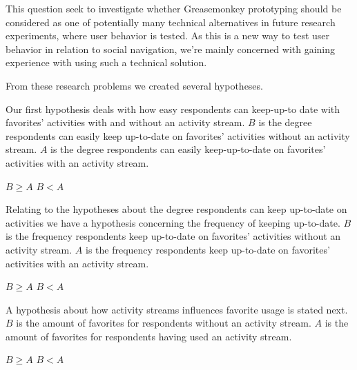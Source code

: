 This question seek to investigate whether Greasemonkey prototyping should be
considered as one of potentially many technical alternatives in future
research experiments, where user behavior is tested. As this is a new way
to test user behavior in relation to social navigation, we're mainly concerned
with gaining experience with using such a technical solution.

\parabreak

From these research problems we created several hypotheses.

Our first hypothesis deals with how easy respondents can keep-up-to
date with favorites' activities with and without an 
activity stream.
$B$ is the degree respondents can easily keep up-to-date on
favorites' activities without an activity stream. $A$ is the degree
respondents can easily keep-up-to-date on favorites' activities  with
an activity stream.
\begin{items}
   $B \geq A$
   $B < A$
\end{items}

Relating to the hypotheses about the degree respondents can keep
up-to-date on activities we have a hypothesis concerning
the frequency of keeping up-to-date.
$B$ is the frequency respondents keep up-to-date on favorites' activities
without an activity stream. $A$ is the frequency respondents keep
up-to-date on favorites' activities with an activity stream.
\begin{items}
   $B \geq A$
   $B < A$
\end{items}

A hypothesis about how activity streams influences favorite usage is stated
next.
$B$ is the amount of favorites for respondents without an activity stream.
$A$ is the amount of favorites for respondents having used an activity
stream.
\begin{items}
   $B \geq A$
   $B < A$
\end{items}
